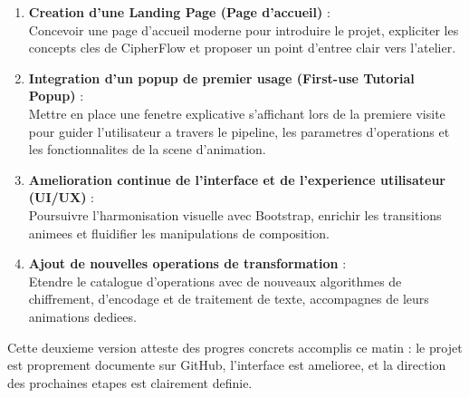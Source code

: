 \documentclass[a4paper,12pt]{report}
\begin{document}
\begin{enumerate}
  \item \textbf{Creation d'une Landing Page (Page d'accueil)} :\\
        Concevoir une page d'accueil moderne pour introduire le projet, expliciter
        les concepts cles de CipherFlow et proposer un point d'entree clair vers l'atelier.

  \item \textbf{Integration d'un popup de premier usage (First-use Tutorial Popup)} :\\
        Mettre en place une fenetre explicative s'affichant lors de la premiere visite
        pour guider l'utilisateur a travers le pipeline, les parametres d'operations et
        les fonctionnalites de la scene d'animation.

  \item \textbf{Amelioration continue de l'interface et de l'experience utilisateur (UI/UX)} :\\
        Poursuivre l'harmonisation visuelle avec Bootstrap, enrichir les transitions
        animees et fluidifier les manipulations de composition.

  \item \textbf{Ajout de nouvelles operations de transformation} :\\
        Etendre le catalogue d'operations avec de nouveaux algorithmes de chiffrement,
        d'encodage et de traitement de texte, accompagnes de leurs animations dediees.
\end{enumerate}

\bigskip

Cette deuxieme version atteste des progres concrets accomplis ce matin : le projet
est proprement documente sur GitHub, l'interface est amelioree, et la direction des
prochaines etapes est clairement definie.
\end{document}
